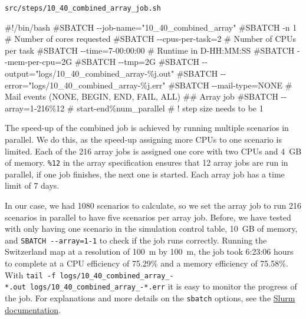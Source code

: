 \documentclass[
  letterpaper,
  DIV=11,
  numbers=noendperiod]{scrreprt}
\newenvironment{Shaded}{\begin{snugshade}}{\end{snugshade}}
\newcommand{\CommentTok}[1]{\textcolor[rgb]{0.37,0.37,0.37}{#1}}
\newcommand{\RegionMarkerTok}[1]{\textcolor[rgb]{0.00,0.23,0.31}{#1}}
\begin{document}
\begin{codelisting}

\caption{\texttt{src/steps/10\_40\_combined\_array\_job.sh}}

\begin{Shaded}
\begin{Highlighting}[]
\CommentTok{\#!/bin/bash}
\CommentTok{\#SBATCH {-}{-}job{-}name="10\_40\_combined\_array"}
\CommentTok{\#SBATCH {-}n 1                  \# Number of cores requested}
\CommentTok{\#SBATCH {-}{-}cpus{-}per{-}task=2     \# Number of CPUs per task}
\CommentTok{\#SBATCH {-}{-}time=7{-}00:00:00     \# Runtime in D{-}HH:MM:SS}
\CommentTok{\#SBATCH {-}{-}mem{-}per{-}cpu=2G}
\CommentTok{\#SBATCH {-}{-}tmp=2G}
\CommentTok{\#SBATCH {-}{-}output="logs/10\_40\_combined\_array{-}\%j.out"}
\CommentTok{\#SBATCH {-}{-}error="logs/10\_40\_combined\_array{-}\%j.err"}
\CommentTok{\#SBATCH {-}{-}mail{-}type=NONE      \# Mail events (NONE, }\RegionMarkerTok{BEGIN}\CommentTok{, }\RegionMarkerTok{END}\CommentTok{, FAIL, ALL)}
\CommentTok{\#\# Array job}
\CommentTok{\#SBATCH {-}{-}array=1{-}216\%12      \# start{-}end\%num\_parallel}
\CommentTok{\#        ! step size needs to be 1}
\end{Highlighting}
\end{Shaded}

\end{codelisting}

The speed-up of the combined job is achieved by running multiple
scenarios in parallel. We do this, as the speed-up assigning more CPUs
to one scenario is limited. Each of the 216 array jobs is assigned one
core with two CPUs and 4~GB of memory. \texttt{\%12} in the array
specification ensures that 12 array jobs are run in parallel, if one job
finishes, the next one is started. Each array job has a time limit of 7
days.

In our case, we had 1080 scenarios to calculate, so we set the array job
to run 216 scenarios in parallel to have five scenarios per array job.
Before, we have tested with only having one scenario in the simulation
control table, 10~GB of memory, and \texttt{SBATCH\ -\/-array=1-1} to
check if the job runs correctly. Running the Switzerland map at a
resolution of 100~m by 100~m, the job took 6:23:06 hours to complete at
a CPU efficiency of 75.29\% and a memory efficiency of 75.58\%. With
\texttt{tail\ -f\ logs/10\_40\_combined\_array\_-*.out\ logs/10\_40\_combined\_array\_-*.err}
it is easy to monitor the progress of the job. For explanations and more
details on the \texttt{sbatch} options, see the
\href{https://slurm.schedmd.com/sbatch.html\#SECTION_OPTIONS}{Slurm
documentation}.
\end{document}
